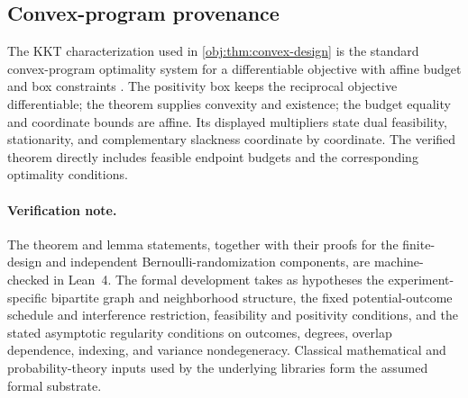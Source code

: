 \subsection{Convex-program provenance}

The KKT characterization used in \cref{obj:thm:convex-design} is the standard convex-program optimality system for a differentiable objective with affine budget and box constraints \citep[Chs.~4--5]{BoydVandenberghe2004}. The positivity box keeps the reciprocal objective differentiable; the theorem supplies convexity and existence; the budget equality and coordinate bounds are affine. Its displayed multipliers state dual feasibility, stationarity, and complementary slackness coordinate by coordinate. The verified theorem directly includes feasible endpoint budgets and the corresponding optimality conditions.

\paragraph{Verification note.}
The theorem and lemma statements, together with their proofs for the finite-design and independent Bernoulli-randomization components, are machine-checked in Lean~4. The formal development takes as hypotheses the experiment-specific bipartite graph and neighborhood structure, the fixed potential-outcome schedule and interference restriction, feasibility and positivity conditions, and the stated asymptotic regularity conditions on outcomes, degrees, overlap dependence, indexing, and variance nondegeneracy. Classical mathematical and probability-theory inputs used by the underlying libraries form the assumed formal substrate.
